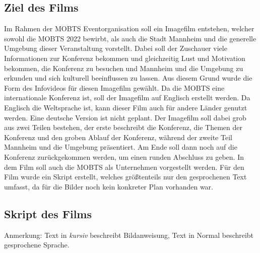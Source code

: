 \subsection{Ziel des Films}
Im Rahmen der \ac{MOBTS} Eventorganisation soll ein Imagefilm entstehen, welcher sowohl die \ac{MOBTS} 2022 bewirbt, als auch die Stadt Mannheim und die generelle Umgebung dieser Veranstaltung vorstellt. Dabei soll der Zuschauer viele Informationen zur Konferenz bekommen und gleichzeitig Lust und Motivation bekommen, die Konferenz zu besuchen und Mannheim und die Umgebung zu erkunden und sich kulturell beeinflussen zu lassen. Aus diesem Grund wurde die Form des Infovideos für diesen Imagefilm gewählt. Da die \ac{MOBTS} eine internationale Konferenz ist, soll der Imagefilm auf Englisch erstellt werden. Da Englisch die Weltsprache ist, kann dieser Film auch für andere Länder genutzt werden. Eine deutsche Version ist nicht geplant. Der Imagefilm soll dabei grob aus zwei Teilen bestehen, der erste beschreibt die Konferenz, die Themen der Konferenz und den groben Ablauf der Konferenz, während der zweite Teil Mannheim und die Umgebung präsentiert. Am Ende soll dann noch auf die Konferenz zurückgekommen werden, um einen runden Abschluss zu geben. In dem Film soll auch die \ac{MOBTS} als Unternehmen vorgestellt werden. Für den Film wurde ein Skript erstellt, welches größtenteils nur den gesprochenen Text umfasst, da für die Bilder noch kein konkreter Plan vorhanden war.
\subsection{Skript des Films}
Anmerkung: Text in \textit{kursiv} beschreibt Bildanweisung, Text in Normal beschreibt gesprochene Sprache.

